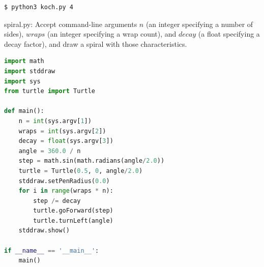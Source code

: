 \documentclass[8pt,a4paper,compress]{beamer}
\begin{document}
\begin{frame}[fragile]
\pause
\bigskip

\begin{minipage}{200pt}
\begin{lstlisting}[language={},style=focusin]
$ python3 koch.py 4
\end{lstlisting}
\end{minipage}%
\hfill
\begin{minipage}{100pt}
\begin{center}
\end{center}
\end{minipage}
\end{frame}

\begin{frame}[fragile]
\pause

\begin{framed}
\tiny spiral.py: Accept command-line arguments $n$ (an integer specifying a number  of sides), $wraps$ (an integer specifying a wrap count), and $decay$ (a float specifying a decay factor), and draw a spiral with those characteristics.
\end{framed}

\begin{lstlisting}[language=python,style=focusin]
import math
import stddraw
import sys
from turtle import Turtle

def main():
    n = int(sys.argv[1])
    wraps = int(sys.argv[2])
    decay = float(sys.argv[3])
    angle = 360.0 / n
    step = math.sin(math.radians(angle/2.0))
    turtle = Turtle(0.5, 0, angle/2.0)
    stddraw.setPenRadius(0.0)
    for i in range(wraps * n):
        step /= decay
        turtle.goForward(step)
        turtle.turnLeft(angle)
    stddraw.show()
    
if __name__ == '__main__':
    main()
\end{lstlisting}
\end{frame}
\end{document}
